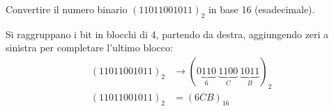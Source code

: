 \begin{Exercise}[label={ex:bin_esa}]
    Convertire il numero binario $(11011001011)_{2}$ in base 16 (esadecimale).
\end{Exercise}

\begin{Answer}[ref={ex:bin_esa}]
    Si raggruppano i bit in blocchi di 4, partendo da destra, aggiungendo zeri a sinistra per completare l'ultimo blocco:
    \begin{align*}
        (11011001011)_{2} &\to (\underbrace{0110}_{6}\ \underbrace{1100}_{C}\ \underbrace{1011}_{B})_{2} \\
        (11011001011)_{2} &= (6CB)_{16}
    \end{align*}
\end{Answer}